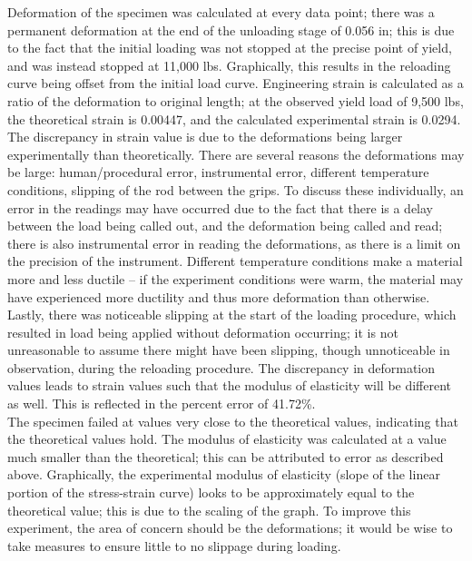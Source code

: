 \documentclass{article}
\begin{document}
    \indent Deformation of the specimen was calculated at every data point; there was a permanent deformation at the end of the unloading stage of 0.056 in; this is due to the fact that the initial loading was not stopped at the precise point of yield, and was instead stopped at 11,000 lbs. Graphically, this results in the reloading curve being offset from the initial load curve. Engineering strain is calculated as a ratio of the deformation to original length; at the observed yield load of 9,500 lbs, the theoretical strain is 0.00447, and the calculated experimental strain is 0.0294. The discrepancy in strain value is due to the deformations being larger experimentally than theoretically. There are several reasons the deformations may be large: human/procedural error, instrumental error, different temperature conditions, slipping of the rod between the grips. To discuss these individually, an error in the readings may have occurred due to the fact that there is a delay between the load being called out, and the deformation being called and read; there is also instrumental error in reading the deformations, as there is a limit on the precision of the instrument. Different temperature conditions make a material more and less ductile – if the experiment conditions were warm, the material may have experienced more ductility and thus more deformation than otherwise. Lastly, there was noticeable slipping at the start of the loading procedure, which resulted in load being applied without deformation occurring; it is not unreasonable to assume there might have been slipping, though unnoticeable in observation, during the reloading procedure. The discrepancy in deformation values leads to strain values such that the modulus of elasticity will be different as well. This is reflected in the percent error of 41.72\%.  \\
    \indent The specimen failed at values very close to the theoretical values, indicating that the theoretical values hold. The modulus of elasticity was calculated at a value much smaller than the theoretical; this can be attributed to error as described above. Graphically, the experimental modulus of elasticity (slope of the linear portion of the stress-strain curve) looks to be approximately equal to the theoretical value; this is due to the scaling of the graph. To improve this experiment, the area of concern should be the deformations; it would be wise to take measures to ensure little to no slippage during loading.  
    \newpage
\end{document}
